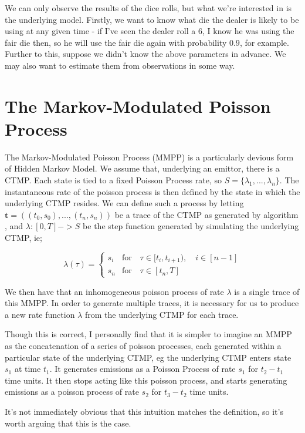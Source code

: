 We can only observe the results of the dice rolls, but what we're interested in is the underlying model. Firstly, we want to know what die the dealer is likely to be using at any given time - if I've seen the dealer roll a 6, I know he was using the fair die then, so he will use the fair die again with probability $0.9$, for example. Further to this, suppose we didn't know the above parameters in advance. We may also want to estimate them from observations in some way.

\section{The Markov-Modulated Poisson Process}

The Markov-Modulated Poisson Process (MMPP) is a particularly devious form of Hidden Markov Model. We assume that, underlying an emittor, there is a CTMP. Each state is tied to a fixed Poisson Process rate, so $S = \{\lambda_1,...,\lambda_n\}$. The instantaneous rate of the poisson process is then defined by the state in which the underlying CTMP resides. We can define such a process by letting $\mathbf{t} = ((t_0,s_0),...,(t_n,s_n))$ be a trace of the CTMP as generated by algorithm \label{algctmp}
, and $\lambda : [0,T]->S$ be the step function generated by simulating the underlying CTMP, ie;

$$
\lambda(\tau) = 
\begin{cases}
	s_i & \mbox{for} \quad \tau \in [t_i,t_{i+1}), \quad i \in [n-1]\\
	s_n & \mbox{for} \quad \tau \in [t_n,T]
\end{cases}
$$

We then have that an inhomogeneous poisson process of rate $\lambda$ is a single trace of this MMPP. In order to generate multiple traces, it is necessary for us to produce a new rate function $\lambda$ from the underlying CTMP for each trace.

Though this is correct, I personally find that it is simpler to imagine an MMPP as the concatenation of a series of poisson processes, each generated within a particular state of the underlying CTMP, eg the underlying CTMP enters state $s_1$ at time $t_1$. It generates emissions as a Poisson Process of rate $s_1$ for $t_2-t_1$ time units. It then stops acting like this poisson process, and starts generating emissions as a poisson process of rate $s_2$ for $t_3-t_2$ time units.

It's not immediately obvious that this intuition matches the definition, so it's worth arguing that this is the case.

